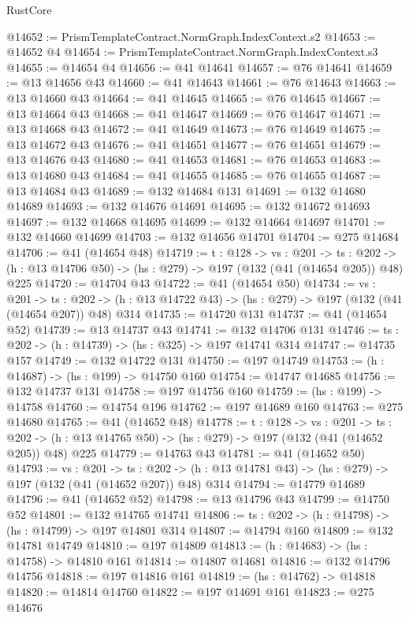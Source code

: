 \begin{lexlean}{RustCore}
\begin{coremodule}
@14652 := PrismTemplateContract.NormGraph.IndexContext.s2
@14653 := @14652 @4
@14654 := PrismTemplateContract.NormGraph.IndexContext.s3
@14655 := @14654 @4
@14656 := @41 @14641
@14657 := @76 @14641
@14659 := @13 @14656 @43
@14660 := @41 @14643
@14661 := @76 @14643
@14663 := @13 @14660 @43
@14664 := @41 @14645
@14665 := @76 @14645
@14667 := @13 @14664 @43
@14668 := @41 @14647
@14669 := @76 @14647
@14671 := @13 @14668 @43
@14672 := @41 @14649
@14673 := @76 @14649
@14675 := @13 @14672 @43
@14676 := @41 @14651
@14677 := @76 @14651
@14679 := @13 @14676 @43
@14680 := @41 @14653
@14681 := @76 @14653
@14683 := @13 @14680 @43
@14684 := @41 @14655
@14685 := @76 @14655
@14687 := @13 @14684 @43
@14689 := @132 @14684 @131
@14691 := @132 @14680 @14689
@14693 := @132 @14676 @14691
@14695 := @132 @14672 @14693
@14697 := @132 @14668 @14695
@14699 := @132 @14664 @14697
@14701 := @132 @14660 @14699
@14703 := @132 @14656 @14701
@14704 := @275 @14684
@14706 := @41 (@14654 @48)
@14719 := {t : @128} ->
  {vs : @201} ->
  {ts : @202} -> (h : @13 @14706 @50) -> (hs : @279) -> @197 (@132 (@41 (@14654 @205)) @48) @225
@14720 := @14704 @43
@14722 := @41 (@14654 @50)
@14734 := {vs : @201} ->
  {ts : @202} -> (h : @13 @14722 @43) -> (hs : @279) -> @197 (@132 (@41 (@14654 @207)) @48) @314
@14735 := @14720 @131
@14737 := @41 (@14654 @52)
@14739 := @13 @14737 @43
@14741 := @132 @14706 @131
@14746 := {ts : @202} -> (h : @14739) -> (hs : @325) -> @197 @14741 @314
@14747 := @14735 @157
@14749 := @132 @14722 @131
@14750 := @197 @14749
@14753 := (h : @14687) -> (hs : @199) -> @14750 @160
@14754 := @14747 @14685
@14756 := @132 @14737 @131
@14758 := @197 @14756 @160
@14759 := (hs : @199) -> @14758
@14760 := @14754 @196
@14762 := @197 @14689 @160
@14763 := @275 @14680
@14765 := @41 (@14652 @48)
@14778 := {t : @128} ->
  {vs : @201} ->
  {ts : @202} -> (h : @13 @14765 @50) -> (hs : @279) -> @197 (@132 (@41 (@14652 @205)) @48) @225
@14779 := @14763 @43
@14781 := @41 (@14652 @50)
@14793 := {vs : @201} ->
  {ts : @202} -> (h : @13 @14781 @43) -> (hs : @279) -> @197 (@132 (@41 (@14652 @207)) @48) @314
@14794 := @14779 @14689
@14796 := @41 (@14652 @52)
@14798 := @13 @14796 @43
@14799 := @14750 @52
@14801 := @132 @14765 @14741
@14806 := {ts : @202} -> (h : @14798) -> (hs : @14799) -> @197 @14801 @314
@14807 := @14794 @160
@14809 := @132 @14781 @14749
@14810 := @197 @14809
@14813 := (h : @14683) -> (hs : @14758) -> @14810 @161
@14814 := @14807 @14681
@14816 := @132 @14796 @14756
@14818 := @197 @14816 @161
@14819 := (hs : @14762) -> @14818
@14820 := @14814 @14760
@14822 := @197 @14691 @161
@14823 := @275 @14676

\end{coremodule}
\end{lexlean}
